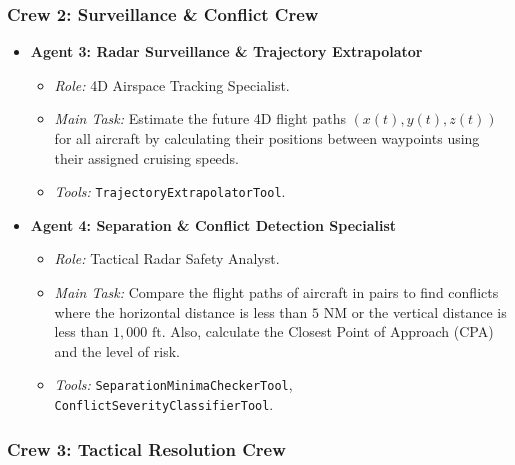 \documentclass[12pt,a4paper]{article}
\begin{document}
\subsubsection{Crew 2: Surveillance \& Conflict Crew}

\begin{itemize}[leftmargin=*]
    \item \textbf{Agent 3: Radar Surveillance \& Trajectory Extrapolator}
\begin{itemize}
    \item \textit{Role:} 4D Airspace Tracking Specialist.
    \item \textit{Main Task:} Estimate the future 4D flight paths $(x(t), y(t), z(t))$ for all aircraft by calculating their positions between waypoints using their assigned cruising speeds.
    \item \textit{Tools:} \texttt{TrajectoryExtrapolatorTool}.
\end{itemize}

    \item \textbf{Agent 4: Separation \& Conflict Detection Specialist}
\begin{itemize}
    \item \textit{Role:} Tactical Radar Safety Analyst.
    \item \textit{Main Task:} Compare the flight paths of aircraft in pairs to find conflicts where the horizontal distance is less than $5\text{ NM}$ or the vertical distance is less than $1,000\text{ ft}$. Also, calculate the Closest Point of Approach (CPA) and the level of risk.
    \item \textit{Tools:} \texttt{SeparationMinimaCheckerTool}, \texttt{ConflictSeverityClassifierTool}.
\end{itemize}
\end{itemize}


\subsubsection{Crew 3: Tactical Resolution Crew}
\end{document}
